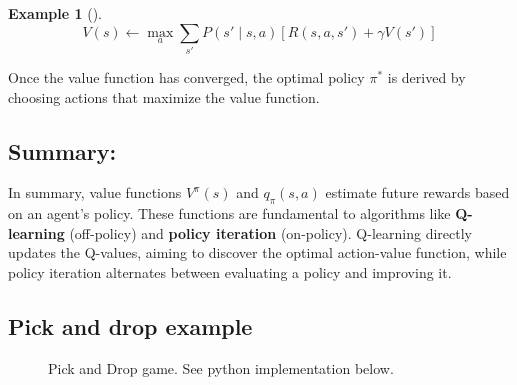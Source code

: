 \documentclass[
  letterpaper,
]{krantz}
\theoremstyle{plain}
\theoremstyle{definition}
\newtheorem{example}{Example}[chapter]
\theoremstyle{definition}
\theoremstyle{remark}
\begin{document}
\begin{example}[]
\[
V(s) \leftarrow \max_a \sum_{s'} P(s' \mid s, a) \left[ R(s, a, s') + \gamma V(s') \right]
\]

Once the value function has converged, the optimal policy \(\pi^*\) is
derived by choosing actions that maximize the value function.

\subsection{Summary:}\label{summary-1}

In summary, value functions \(V^\pi(s)\) and \(q_{\pi}(s, a)\) estimate
future rewards based on an agent's policy. These functions are
fundamental to algorithms like \textbf{Q-learning} (off-policy) and
\textbf{policy iteration} (on-policy). Q-learning directly updates the
Q-values, aiming to discover the optimal action-value function, while
policy iteration alternates between evaluating a policy and improving
it.

\subsection{Pick and drop example}\label{pick-and-drop-example}

\begin{figure}


\caption{\label{fig-pick_and_drop_exm}Pick and Drop game. See python
implementation below.}


\end{figure}
\end{example}
\end{document}
